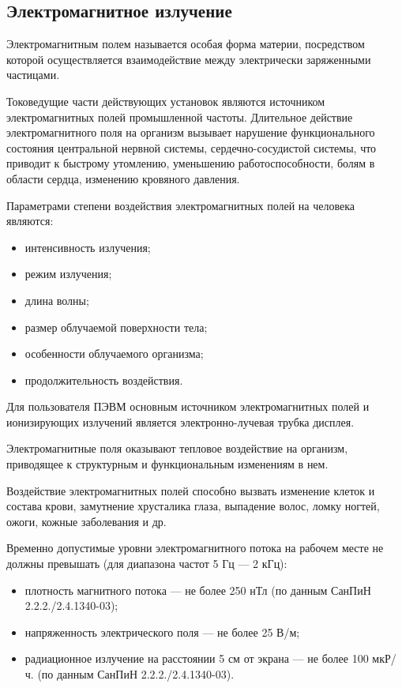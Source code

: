 \subsection{Электромагнитное излучение}
Электромагнитным полем называется особая форма материи, посредством которой осуществляется взаимодействие между электрически заряженными частицами.

Токоведущие части действующих установок являются источником электромагнитных полей промышленной частоты.
Длительное действие электромагнитного поля на организм вызывает нарушение функционального состояния центральной нервной системы, сердечно-сосудистой системы, что приводит к быстрому утомлению, уменьшению работоспособности, болям в области сердца, изменению кровяного давления.

Параметрами степени воздействия электромагнитных полей на человека являются:
\begin{itemize}
  \item{интенсивность излучения;}
  \item{режим излучения;}
  \item{длина волны;}
  \item{размер облучаемой поверхности тела;}
  \item{особенности облучаемого организма;}
  \item{продолжительность воздействия.}
\end{itemize}

Для пользователя ПЭВМ основным источником электромагнитных полей и ионизирующих излучений является электронно-лучевая трубка дисплея.

Электромагнитные поля оказывают тепловое воздействие на организм, приводящее к структурным и функциональным изменениям в нем.

Воздействие электромагнитных полей способно вызвать изменение клеток и состава крови, замутнение хрусталика глаза, выпадение волос, ломку ногтей, ожоги, кожные заболевания и др.

Временно допустимые уровни электромагнитного потока на рабочем месте не должны превышать (для диапазона частот 5 Гц --- 2 кГц):
\begin{itemize}
  \item{плотность магнитного потока --- не более 250 нТл (по данным СанПиН 2.2.2./2.4.1340-03);}
  \item{напряженность электрического поля --- не более 25 В/м;}
  \item{радиационное излучение на расстоянии 5 см от экрана --- не более 100 мкР/ч. (по данным СанПиН 2.2.2./2.4.1340-03).}
\end{itemize}

